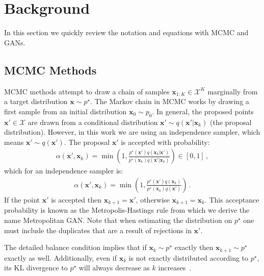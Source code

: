 \documentclass{article}
\renewcommand{\vec}[1]{{\boldsymbol{\mathbf{#1}}}} %
\newcommand{\set}[1]{\mathcal{#1}}
\newcommand{\sample}{\sim}
\newcommand{\given}{|}
\newcommand{\target}{{p^\star}}
\newcommand{\prop}{q}
\newcommand{\pinit}{{p_0}}
\newcommand{\accept}{\alpha}
\newcommand{\setx}{\set{X}}
\begin{document}

\section{Background}

In this section we quickly review the notation and equations with MCMC and GANs.

\subsection{MCMC Methods}

MCMC methods attempt to draw a chain of samples $\vec x_{1:K} \in \setx^K$ marginally from a target distribution $\vec x \sample \target$.
The Markov chain in MCMC works by drawing a first sample from an initial distribution $\vec x_0 \sample \pinit$.
In general, the proposed points $\vec x' \in \setx$ are drawn from a conditional distribution $\vec x' \sample \prop(\vec x' \given \vec x_k)$ (the proposal distribution)\@.
However, in this work we are using an independence sampler, which means $\vec x' \sample \prop(\vec x')$.
The proposal $\vec x'$ is accepted with probability:
\begin{align}
  \accept(\vec x', \vec x_k) = \min\left(1, \frac{\target(\vec x')\prop(\vec x_k \given \vec x')}{\target(\vec x_k)\prop(\vec x' \given \vec x_k)}\right) \in [0,1]\,,
\end{align}
which for an independence sampler is:
\begin{align}
  \accept(\vec x', \vec x_k) = \min\left(1, \frac{\target(\vec x')\prop(\vec x_k)}{\target(\vec x_k)\prop(\vec x')}\right)\,.
\end{align}
If the point $\vec x'$ is accepted then $\vec x_{k+1} = \vec x'$, otherwise $\vec x_{k+1} = \vec x_k$.
This acceptance probability is known as the Metropolis-Hastings rule from which we derive the name Metropolitan GAN\@.
Note that when estimating the distribution on $\target$ one must include the duplicates that are a result of rejections in $\vec x'$.

The detailed balance condition implies that if $\vec x_k \sample \target$ exactly then $\vec x_{k+1} \sample \target$ exactly as well.
Additionally, even if $\vec x_k$ is not exactly distributed according to $\target$, its KL divergence to $\target$ will always decrease as $k$ increases~\citep{Murray2008,Cover2012}.
\end{document}
